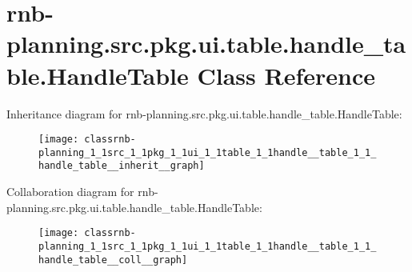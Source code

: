 \hypertarget{classrnb-planning_1_1src_1_1pkg_1_1ui_1_1table_1_1handle__table_1_1_handle_table}{}\section{rnb-\/planning.src.\+pkg.\+ui.\+table.\+handle\+\_\+table.\+Handle\+Table Class Reference}
\label{classrnb-planning_1_1src_1_1pkg_1_1ui_1_1table_1_1handle__table_1_1_handle_table}


Inheritance diagram for rnb-\/planning.src.\+pkg.\+ui.\+table.\+handle\+\_\+table.\+Handle\+Table\+:\nopagebreak
\begin{figure}[H]
\begin{center}
\leavevmode
\texttt{[image: classrnb-planning\_1\_1src\_1\_1pkg\_1\_1ui\_1\_1table\_1\_1handle\_\_table\_1\_1\_handle\_table\_\_inherit\_\_graph]}
\end{center}
\end{figure}


Collaboration diagram for rnb-\/planning.src.\+pkg.\+ui.\+table.\+handle\+\_\+table.\+Handle\+Table\+:\nopagebreak
\begin{figure}[H]
\begin{center}
\leavevmode
\texttt{[image: classrnb-planning\_1\_1src\_1\_1pkg\_1\_1ui\_1\_1table\_1\_1handle\_\_table\_1\_1\_handle\_table\_\_coll\_\_graph]}
\end{center}
\end{figure}
